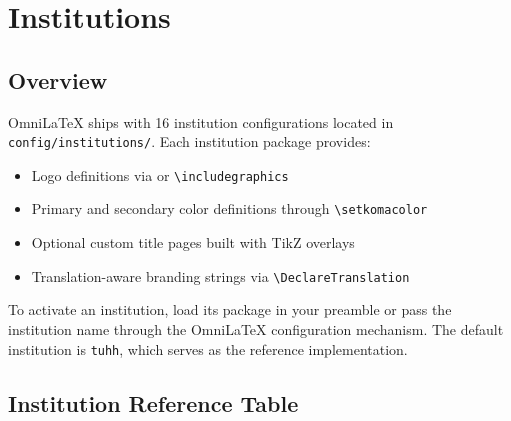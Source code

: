 \chapter{Institutions}
\label{ch:institutions}

\section{Overview}

OmniLaTeX ships with 16 institution configurations located in
\texttt{config/institutions/}. Each institution package provides:
\begin{itemize}
    \item Logo definitions via \verb|| or \verb|\includegraphics|
    \item Primary and secondary color definitions through \verb|\setkomacolor|
    \item Optional custom title pages built with TikZ overlays
    \item Translation-aware branding strings via \verb|\DeclareTranslation|
\end{itemize}

To activate an institution, load its package in your preamble or pass the
institution name through the OmniLaTeX configuration mechanism. The default
institution is \texttt{tuhh}, which serves as the reference implementation.

\section{Institution Reference Table}

